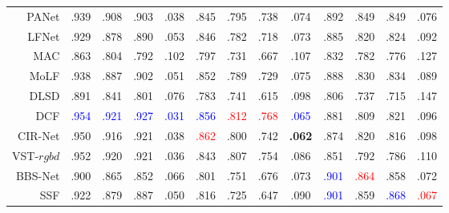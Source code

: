 \begin{table}[!ht]
{\begin{tabular}{rcccccccccccc}
			PANet \cite{piao2021panet} 
			& .939 & .908 & .903 & .038 
			& .845 & .795 & .738 & .074 
			& .892 & .849 & .849 & .076
			\\
			
			LFNet	 \cite{zhang2020lfnet} 
			& .929 & .878 & .890 & .053
			&	.846 &	.782 &	.718 &	.073 
			&	.885 &	.820 &	.824 &	.092 \\
			
			MAC	 \cite{zhang2020light} 
			& .863	& .804	& .792	& .102	
			&   .797 & .731 & .667 & .107 
			& .832 & .782 & .776 & .127 \\
			
			MoLF	 \cite{zhang2019memory} 
			& .938 & .887 & .902 & .051 
			&	.852 &	.789 &	.729 &	.075 
			&	.888 &	.830 &	.834 &	.089 \\
			
			DLSD	\cite{piao2019deep}
			& .891	& .841	& .801	& .076	
			&   .783 & .741 & .615 & .098 
			& .806 & .737 & .715 & .147 \\
			
			\midrule[1pt] %
			
			
			DCF \cite{ji2021calibrated} 
			& \textcolor{blue}{.954} & \textcolor{blue}{.921} & \textcolor{blue}{.927} & \textcolor{blue}{.031} 
			& \textcolor{blue}{.856} & {\textcolor{red}{.812}} & {\textcolor{red}{.768}} & \textcolor{blue}{.065} 
			& .881 & .809 & .821 & .096 \\
			
			CIR-Net \cite{cong2022cir}
			& .950 & .916 & .921 & .038 
			& {\textcolor{red}{.862}} & .800  			& .742 & \textbf{ {.062}} 
			& .874 & .820 & .816 & .098 \\ 
			
			VST-$rgbd$  \cite{liu2021visual} 
			& .952 & .920 & .921 & .036 
			& .843 & .807 & .754 & .086 
			& .851 & .792 & .786 & .110 
			\\
			
			
			BBS-Net     \cite{fan2020bbs} 
			& .900 & .865 & .852 & .066 
			& .801 & .751 & .676 & .073 
			& \textcolor{blue}{.901} & {\textcolor{red}{.864}} & .858 & .072 \\ 
			
			SSF     \cite{zhang2020select} 
			& .922 & .879 & .887 & .050 
			& .816 & .725 & .647 & .090 
			& \textcolor{blue}{.901} & .859 & \textcolor{blue}{.868} & {\textcolor{red}{.067}} \\ 
			

\end{tabular}}
\end{table}

